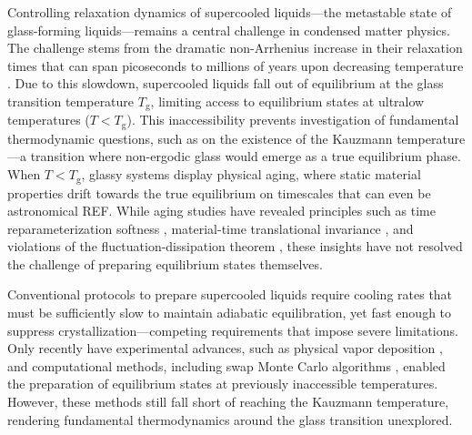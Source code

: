 \documentclass[%
 reprint,
 amsmath,amssymb,
 aps,
]{revtex4-2}
\begin{document}
Controlling relaxation dynamics of supercooled liquids---the metastable state of glass-forming liquids---remains a central challenge in condensed matter physics.
The challenge stems from the dramatic non-Arrhenius increase in their relaxation times that can span picoseconds to millions of years upon decreasing temperature \cite{angell2000relaxation}. 
Due to this slowdown, supercooled liquids fall out of equilibrium at the glass transition temperature $T_\mathrm{g}$, limiting access to equilibrium states at ultralow temperatures ($T < T_\mathrm{g}$). 
This inaccessibility prevents investigation of fundamental thermodynamic questions, such as on the existence of the Kauzmann temperature---a transition where non-ergodic glass would emerge as a true equilibrium phase.
When $T < T_\mathrm{g}$, glassy systems display physical aging, where static material properties drift towards the true equilibrium \cite{berthier2011theoretical,biroli2013perspective} on timescales that can even be astronomical REF.
While aging studies have revealed principles such as time reparameterization softness \cite{chamon2002separation,ghimenti2024cleveralgorithmsglassesdo, bohmer2024time}, material-time translational invariance \cite{chamon2002separation,ghimenti2024cleveralgorithmsglassesdo,bohmer2024time}, and violations of the fluctuation-dissipation theorem \cite{chamon2002separation, BarratKob1999, di2000off, grigera1999observation, PhysRevLett.93.160603, wang2006dynamic}, these insights have not resolved the challenge of preparing equilibrium states themselves.

Conventional protocols to prepare supercooled liquids require cooling rates that must be sufficiently slow to maintain adiabatic equilibration, yet fast enough to suppress crystallization---competing requirements that impose severe limitations. %
Only recently have experimental advances, such as physical vapor deposition \cite{ediger2017perspective,rodriguez2022ultrastable}, and computational methods, including swap Monte Carlo algorithms \cite{ninarello2017models,scalliet2022thirty,jung2025numericalinvestigationequilibriumkauzmann}, enabled the preparation of equilibrium states at previously inaccessible temperatures.
However, these methods still fall short of reaching the Kauzmann temperature, rendering fundamental thermodynamics around the glass transition unexplored.
\end{document}
